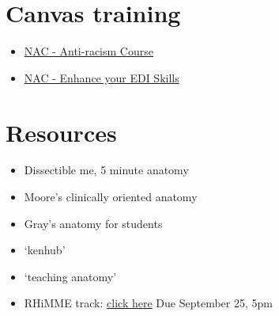 \section{Canvas training}

\begin{itemize}
    \item \href{https://canvas.swansea.ac.uk/enroll/KTCJNL?enrolled=1}{NAC - Anti-racism Course}
    \item \href{https://canvas.swansea.ac.uk/enroll/N8KECX}{NAC - Enhance your EDI Skills}
\end{itemize}


\section{Resources}

\begin{itemize}
    \item Dissectible me, 5 minute anatomy
    \item Moore's clinically oriented anatomy
    \item Gray's anatomy for students
    \item `kenhub'
    \item `teaching anatomy'
    \item RHiMME track: \href{https://forms.cloud.microsoft/Pages/ResponsePage.aspx?id=LrXKu76f1kOi859mxD3yaEv50t8V6HJGhLbdbv-llK9UMlVKTTlQMkNIS01OVFNaVDRUNVBYTlJOTi4u&origin=QRCodehttps://forms.cloud.microsoft/Pages/ResponsePage.aspx?id=LrXKu76f1kOi859mxD3yaEv50t8V6HJGhLbdbv-llK9UMlVKTTlQMkNIS01OVFNaVDRUNVBYTlJOTi4u&origin=QRCode}{click here} Due September 25, 5pm
\end{itemize}